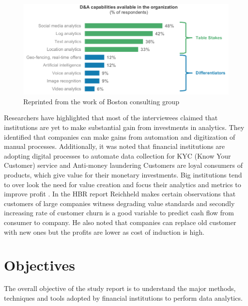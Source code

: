 \begin{figure}[H]
	\includegraphics[scale = 0.5]{figures/DA_capabilities.png}
	\caption[Da capablities]{Reprinted from the work of Boston consulting group  }
	\label{fig:da_capabilities}
\end{figure}
\FloatBarrier

Researchers have highlighted that most of the interviewees claimed that institutions are yet to make substantial gain from investments in analytics. They identified that companies can make gains from automation and digitization of manual processes. Additionally, it was noted that financial institutions are adopting digital processes to automate data collection for KYC (Know Your Customer) service and Anti-money laundering 
Customers are loyal consumers of products, which give value for their monetary investments. Big institutions tend to over look the need for value creation and focus their analytics and metrics to improve profit . In the HBR report Reichheld makes certain  observations that customers of large companies witness degrading value standards and secondly increasing rate of customer churn is a good variable to predict cash flow from consumer to company. He also noted that companies can replace old customer with new ones but the profits are lower as cost of induction is high.


	



\newpage
\section{Objectives}

The overall objective of the study report is to understand the major methods, techniques and tools adopted by financial institutions to perform data analytics.



